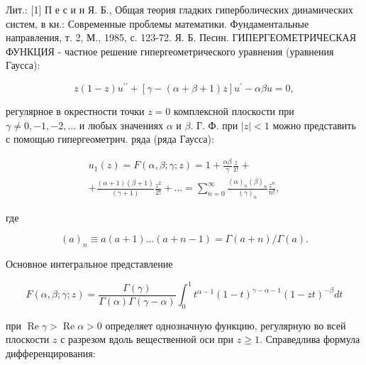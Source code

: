 \documentclass[10pt]{article}
\begin{document}
Лит.: [1] П е с и н Я. Б., Общая теория гладких гиперболических динамических систем, в кн.: Современные проблемы математики. Фундаментальные направления, т. 2, М., 1985, с. 123-72. Я. Б. Песин. ГИПЕРГЕОМЕТРИЧЕСКАЯ ФУНКЦИЯ - частное решение гипергеометрического уравнения (уравнения Гаусса):



\[

z(1-z) u^{\prime \prime}+[\gamma-(\alpha+\beta+1) z] u^{\prime}-\alpha \beta u=0,

\]



регулярное в окрестности точки $z=0$ комплексной плоскости при $\gamma \neq 0,-1,-2, \ldots$ и любых значениях $\alpha$ и $\beta$. Г. Ф. при $|z|<1$ можно представить с помощью гипергеометрич. ряда (ряда Гаусса):



\[

\begin{gathered}

u_{1}(z)=F(\alpha, \beta ; \gamma ; z)=1+\frac{\alpha \beta}{\gamma} \frac{z}{1 !}+ \\

+\frac{(\alpha+1)(\beta+1)}{(\gamma+1)} \frac{z^{2}}{2 !}+\ldots=\sum_{n=0}^{\infty} \frac{(\alpha)_{n}(\beta)_{n}}{(\gamma)_{n}} \frac{z^{n}}{n !},

\end{gathered}

\]



где



\[

(a)_{n} \equiv a(a+1) \ldots(a+n-1)=\Gamma(a+n) / \Gamma(a) .

\]



Основное интегральное представление



\[

F(\alpha, \beta ; \gamma ; z)=\frac{\Gamma(\gamma)}{\Gamma(\alpha) \Gamma(\gamma-\alpha)} \int_{0}^{1} t^{\alpha-1}(1-t)^{\gamma-\alpha-1}(1-z t)^{-\beta} d t

\]



при $\operatorname{Re} \gamma>\operatorname{Re} \alpha>0$ определяет однозначную функцию, регулярную во всей плоскости $z$ с разрезом вдоль вещественной оси при $z \geqslant 1$. Справедлива формула дифференцирования:
\end{document}
